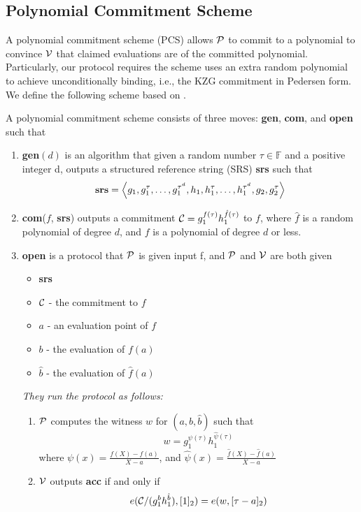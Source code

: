 \subsection{Polynomial Commitment Scheme}
A polynomial commitment scheme (PCS) allows $\mathcal{P}$ to commit to a polynomial to convince $\mathcal{V}$ that claimed evaluations are of the committed polynomial. Particularly, our protocol requires the scheme uses an extra random polynomial to achieve unconditionally binding, i.e., the KZG commitment in Pedersen form. We define the following scheme based on \cite{kzg,plonk,bdfg}.
\begin{definition}
\label{def:pcs}
A polynomial commitment scheme consists of three moves: \textbf{gen}, \textbf{com}, and \textbf{open} such that
\begin{enumerate}
    \item \textbf{gen}$(d)$ is an algorithm that given a random number $\tau\in\mathbb{F}$ and a positive integer d, outputs a structured reference string (SRS) \textbf{srs} such that
    \[ \textbf{srs}=\left \langle g_1,g_1^\tau,\dots,g_1^{\tau^d},h_1,h_1^\tau,\dots,h_1^{\tau^d},g_2,g_2^\tau \right \rangle \]
    \item \textbf{com}($f$, \textbf{srs}) outputs a commitment $\mathcal{C}=g_1^{f(\tau)}h_1^{\hat{f}(\tau)}$ to $f$, where $\hat{f}$ is a random polynomial of degree $d$, and $f$ is a polynomial of degree $d$ or less.
    \item \textbf{open} is a protocol that $\mathcal{P}$ is given input f, and $\mathcal{P}$ and $\mathcal{V}$ are both given
    \begin{itemize}
        \item \textbf{srs}
        \item $\mathcal{C}$ - the commitment to $f$
        \item $a$ - an evaluation point of $f$
        \item $b$ - the evaluation of $f(a)$
        \item $\hat{b}$ - the evaluation of $\hat{f}(a)$
    \end{itemize}
    \textit{They run the protocol as follows:}
    \begin{enumerate}
        \item $\mathcal{P}$ computes the witness $w$ for $(a,b,\hat{b})$ such that
        \[ w=g_1^{\psi(\tau)}h_1^{\hat\psi(\tau)} \]
        where $\psi(x)=\frac{f(X)-f(a)}{X-a}$, and $\hat\psi(x)=\frac{\hat{f}(X)-\hat{f}(a)}{X-a}$
        \item $\mathcal{V}$ outputs \textbf{acc} if and only if
        \[ e(\mathcal{C}/(g_1^bh_1^{\hat{b}}),[1]_2)=e(w,[\tau-a]_2) \]

\end{enumerate}
\end{enumerate}
\end{definition}
